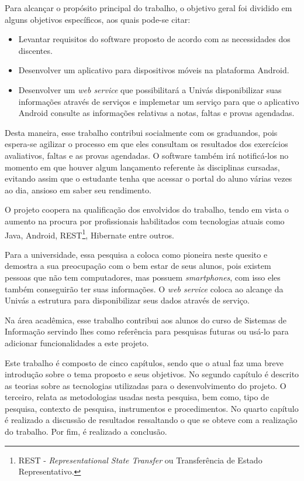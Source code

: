 	\par Para alcançar o propósito principal do trabalho, o objetivo geral foi
dividido em alguns objetivos específicos, aos quais pode-se citar:
	
	\begin{itemize}
	  
	  \item Levantar requisitos do software proposto de acordo com as
	  necessidades dos discentes.
	  
	  \item Desenvolver um aplicativo para dispositivos móveis na plataforma
	  Android.
	  
	  \item Desenvolver um \textit{web service} que possibilitará a Univás
	  disponibilizar suas informações através de serviços e implemetar um serviço
	  para que o aplicativo Android consulte as informações  relativas a notas,
	  faltas e provas agendadas.
	
	\end{itemize}
	
	\par Desta maneira, esse trabalho contribui socialmente com os graduandos, pois
espera-se agilizar o processo em que eles consultam os resultados dos
exercícios avaliativos, faltas e as provas agendadas. O software também irá
notificá-los no momento em que houver algum lançamento referente às disciplinas
cursadas, evitando assim que o estudante tenha que acessar o portal do aluno
várias vezes ao dia, ansioso em saber seu rendimento.

	\par O projeto coopera na qualificação dos envolvidos do trabalho, tendo em
vista o aumento na procura por profissionais habilitados com tecnologias atuais
como Java, Android, REST\footnote{REST - \textit{Representational State
Transfer} ou Transferência de Estado Representativo.}, Hibernate entre outros.

	\par Para a universidade, essa pesquisa a coloca como pioneira neste quesito e
demostra a sua preocupação com o bem estar de seus alunos, pois existem pessoas
que não tem computadores, mas possuem \textit{smartphones}, com isso eles
também conseguirão ter suas informações. O \textit{web service} coloca ao
alcançe da Univás a estrutura para disponibilizar seus dados através de
serviço.

	\par Na área acadêmica, esse trabalho contribui aos alunos do curso de Sistemas
de Informação servindo lhes como referência para pesquisas futuras ou usá-lo
para adicionar funcionalidades a este projeto.

	\par Este trabalho é composto de cinco capítulos, sendo que o atual faz uma
breve introdução sobre o tema proposto e seus objetivos. No segundo capítulo é
descrito as teorias sobre as tecnologias utilizadas para o desenvolvimento do
projeto. O terceiro, relata as metodologias usadas nesta pesquisa, bem como,
tipo de pesquisa, contexto de pesquisa, instrumentos e procedimentos. No quarto
capítulo é realizado a discussão de resultados ressaltando o que se obteve com
a realização do trabalho. Por fim, é realizado a conclusão.
